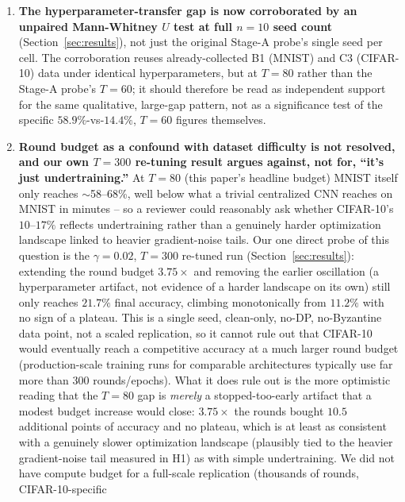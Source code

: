 \documentclass{article}
\begin{document}
\begin{enumerate}
  now at $n{=}8$ (meeting our own reliability threshold, previously flagged
  as underpowered at $n{=}5$), remain a clean null result: all cells sit
  within noise of the 10\% chance level.
\item \textbf{The hyperparameter-transfer gap is now corroborated by an unpaired
  Mann-Whitney $U$ test at full $n{=}10$ seed count} (Section~\ref{sec:results}),
  not just the original Stage-A probe's single seed per cell. The corroboration
  reuses already-collected B1 (MNIST) and C3 (CIFAR-10) data under identical
  hyperparameters, but at $T{=}80$ rather than the Stage-A probe's $T{=}60$; it
  should therefore be read as independent support for the same qualitative,
  large-gap pattern, not as a significance test of the specific
  $58.9\%$-vs-$14.4\%$, $T{=}60$ figures themselves.
\item \textbf{Round budget as a confound with dataset difficulty is not
  resolved, and our own $T{=}300$ re-tuning result argues against, not for,
  ``it's just undertraining.''} At $T{=}80$ (this paper's headline budget)
  MNIST itself only reaches $\sim$58--68\%, well below what a trivial
  centralized CNN reaches on MNIST in minutes -- so a reviewer could
  reasonably ask whether CIFAR-10's $10$--$17\%$ reflects undertraining
  rather than a genuinely harder optimization landscape linked to heavier
  gradient-noise tails. Our one direct probe of this question is the
  $\gamma{=}0.02$, $T{=}300$ re-tuned run (Section~\ref{sec:results}):
  extending the round budget $3.75\times$ and removing the earlier
  oscillation (a hyperparameter artifact, not evidence of a harder
  landscape on its own) still only reaches $21.7\%$ final accuracy, climbing
  monotonically from $11.2\%$ with no sign of a plateau. This is a single
  seed, clean-only, no-DP, no-Byzantine data point, not a scaled replication,
  so it cannot rule out that CIFAR-10 would eventually reach a competitive
  accuracy at a much larger round budget (production-scale training runs for
  comparable architectures typically use far more than 300 rounds/epochs). What
  it does rule out is the more optimistic reading that the $T{=}80$ gap is
  \emph{merely} a stopped-too-early artifact that a modest budget increase
  would close: $3.75\times$ the rounds bought $10.5$ additional points of
  accuracy and no plateau, which is at least as consistent with a genuinely
  slower optimization landscape (plausibly tied to the heavier gradient-noise
  tail measured in H1) as with simple undertraining. We did not have compute
  budget for a full-scale replication (thousands of rounds, CIFAR-10-specific

\end{enumerate}
\end{document}
